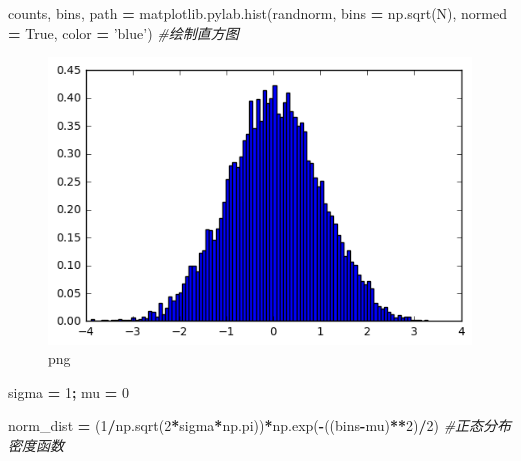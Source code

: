 \documentclass[]{article}
\newenvironment{Shaded}{\begin{snugshade}}{\end{snugshade}}
\newcommand{\DecValTok}[1]{\textcolor[rgb]{0.00,0.00,0.81}{#1}}
\newcommand{\StringTok}[1]{\textcolor[rgb]{0.31,0.60,0.02}{#1}}
\newcommand{\CommentTok}[1]{\textcolor[rgb]{0.56,0.35,0.01}{\textit{#1}}}
\newcommand{\VariableTok}[1]{\textcolor[rgb]{0.00,0.00,0.00}{#1}}
\newcommand{\OperatorTok}[1]{\textcolor[rgb]{0.81,0.36,0.00}{\textbf{#1}}}
\newcommand{\NormalTok}[1]{#1}
\begin{document}
\begin{Shaded}
\begin{Highlighting}[]
\NormalTok{counts, bins, path }\OperatorTok{=}\NormalTok{ matplotlib.pylab.hist(randnorm, bins }\OperatorTok{=}\NormalTok{ np.sqrt(N), normed }\OperatorTok{=} \VariableTok{True}\NormalTok{, color }\OperatorTok{=} \StringTok{'blue'}\NormalTok{) }\CommentTok{#绘制直方图}
\end{Highlighting}
\end{Shaded}

\begin{figure}
\centering
\includegraphics{output_196_0.png}
\caption{png}
\end{figure}

\begin{Shaded}
\begin{Highlighting}[]
\NormalTok{sigma }\OperatorTok{=} \DecValTok{1}\OperatorTok{;}\NormalTok{ mu }\OperatorTok{=} \DecValTok{0}
\end{Highlighting}
\end{Shaded}

\begin{Shaded}
\begin{Highlighting}[]
\NormalTok{norm_dist }\OperatorTok{=}\NormalTok{ (}\DecValTok{1}\OperatorTok{/}\NormalTok{np.sqrt(}\DecValTok{2}\OperatorTok{*}\NormalTok{sigma}\OperatorTok{*}\NormalTok{np.pi))}\OperatorTok{*}\NormalTok{np.exp(}\OperatorTok{-}\NormalTok{((bins}\OperatorTok{-}\NormalTok{mu)}\OperatorTok{**}\DecValTok{2}\NormalTok{)}\OperatorTok{/}\DecValTok{2}\NormalTok{)  }\CommentTok{#正态分布密度函数}
\end{Highlighting}
\end{Shaded}
\end{document}
